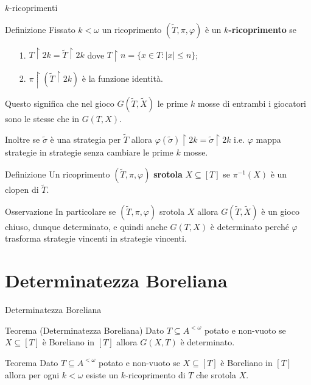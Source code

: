 \documentclass[aspectratio=43]{beamer}
\begin{document}
\begin{frame}{\(k\)-ricoprimenti}
  \begin{block}{Definizione}
    Fissato \(k < \omega\) un ricoprimento \((\tilde{T}, \pi, \varphi)\) è un \textbf{\(k\)-ricoprimento} se
    \begin{itemize}
    \item[1.] \(T \upharpoonright 2k = \tilde{T} \upharpoonright 2k\) dove \(T \upharpoonright n = \{x \in T : |x| \leq n\}\);
    \item[2.] \(\pi \upharpoonright (\tilde{T} \upharpoonright 2k)\) è la funzione identità.
    \end{itemize}
  \end{block}
  \pause
  \begin{block}{}
    Questo significa che nel gioco \(G(\tilde{T}, \tilde{X})\) le prime \(k\) mosse di entrambi i giocatori sono le stesse che in \(G(T, X)\).
  \end{block}
  \pause
  \begin{block}{}
    Inoltre se \(\tilde{\sigma}\) è una strategia per \(\tilde{T}\) allora \(\varphi(\tilde{\sigma}) \upharpoonright 2k = \tilde{\sigma} \upharpoonright 2k\) i.e. \(\varphi\) mappa strategie in strategie senza cambiare le prime \(k\) mosse.
  \end{block}
\end{frame}

\begin{frame}
  \begin{block}{Definizione}
    Un ricoprimento \((\tilde{T}, \pi, \varphi)\) \textbf{srotola} \(X \subseteq [T]\) se \(\pi^{-1}(X)\) è un clopen di \(\tilde{T}\).
  \end{block}
  \pause
  \begin{block}{Osservazione}
    In particolare se \((\tilde{T}, \pi, \varphi)\) srotola \(X\) allora \(G(\tilde{T}, \tilde{X})\) è un gioco chiuso, dunque determinato, e quindi anche \(G(T, X)\) è determinato perché \(\varphi\) trasforma strategie vincenti in strategie vincenti.
  \end{block}
\end{frame}

\section{Determinatezza Boreliana}

\begin{frame}{Determinatezza Boreliana}
  \begin{block}{Teorema (Determinatezza Boreliana)}
    Dato \(T \subseteq A^{<\omega}\) potato e non-vuoto se \(X \subseteq [T]\) è Boreliano in \([T]\) allora \(G(X, T)\) è determinato.
  \end{block}
  \pause
  \begin{block}{Teorema}
    Dato \(T \subseteq A^{<\omega}\) potato e non-vuoto se \(X \subseteq [T]\) è Boreliano in \([T]\) allora per ogni \(k < \omega\) esiste un \(k\)-ricoprimento di \(T\) che srotola \(X\).
  \end{block}
\end{frame}
\end{document}
